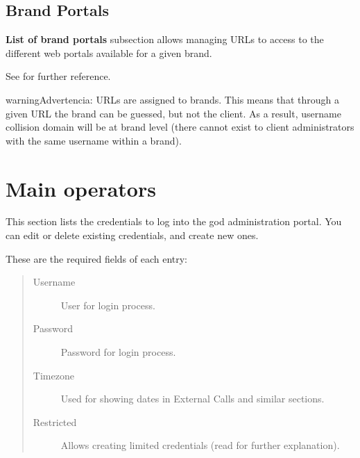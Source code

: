 \documentclass[letterpaper,10pt,spanish]{sphinxmanual}
\begin{document}
\subsection{Brand Portals}
\label{administration_portal/platform/brands:brand-portals}\label{administration_portal/platform/brands:id3}
\textbf{List of brand portals} subsection allows managing URLs to access to the different web portals available for a given brand.

See {\hyperref[administration_portal/brand/settings/client_portals:id1]{}} for further reference.

\begin{notice}{warning}{Advertencia:}
URLs are assigned to brands. This means that through a given URL the brand can be guessed, but not the client.
As a result, username collision domain will be at brand level (there cannot exist to client administrators
with the same username within a brand).
\end{notice}


\section{Main operators}
\label{administration_portal/platform/main_operators::doc}\label{administration_portal/platform/main_operators:main-operators}\label{administration_portal/platform/main_operators:id1}
This section lists the credentials to log into the god administration portal. You can edit or delete existing credentials,
and create new ones.

These are the required fields of each entry:
\begin{quote}
\begin{description}
\item[{Username}] \leavevmode
User for login process.

\item[{Password}] \leavevmode
Password for login process.

\item[{Timezone}] \leavevmode
Used for showing dates in External Calls and similar sections.

\item[{Restricted}] \leavevmode
Allows creating limited credentials (read {\hyperref[api_rest/acls:acls]{}} for further explanation).

\end{description}
\end{quote}
\end{document}
